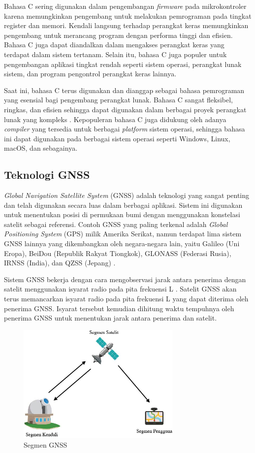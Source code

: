 Bahasa C sering digunakan dalam pengembangan \textit{firmware} pada mikrokontroler karena memungkinkan pengembang untuk melakukan pemrograman pada tingkat register dan memori. Kendali langsung terhadap perangkat keras memungkinkan pengembang untuk merancang program dengan performa tinggi dan efisien. Bahasa C juga dapat diandalkan dalam mengakses perangkat keras yang terdapat dalam sistem tertanam. Selain itu, bahasa C juga populer untuk pengembangan aplikasi tingkat rendah seperti sistem operasi, perangkat lunak sistem, dan program pengontrol perangkat keras lainnya.

Saat ini, bahasa C terus digunakan dan dianggap sebagai bahasa pemrograman yang esensial bagi pengembang perangkat lunak. Bahasa C sangat fleksibel, ringkas, dan efisien sehingga dapat digunakan dalam berbagai proyek perangkat lunak yang kompleks \cite{Deitel2016}. Kepopuleran bahasa C juga didukung oleh adanya \textit{compiler} yang tersedia untuk berbagai \textit{platform} sistem operasi, sehingga bahasa ini dapat digunakan pada berbagai sistem operasi seperti Windows, Linux, macOS, dan sebagainya.

\subsection{Teknologi GNSS}
\textit{Global Navigation Satellite System} (GNSS) adalah teknologi yang sangat penting dan telah digunakan secara luas dalam berbagai aplikasi. Sistem ini digunakan untuk menentukan posisi di permukaan bumi dengan menggunakan konstelasi satelit sebagai referensi. Contoh GNSS yang paling terkenal adalah \textit{Global Positioning System} (GPS) milik Amerika Serikat, namun terdapat lima sistem GNSS lainnya yang dikembangkan oleh negara-negara lain, yaitu Galileo (Uni Eropa), BeiDou (Republik Rakyat Tiongkok), GLONASS (Federasi Rusia), IRNSS (India), dan QZSS (Jepang) \cite{NationalCoordinationOfficeforSpace-BasedPositioning2021}.

Sistem GNSS bekerja dengan cara mengobservasi jarak antara penerima dengan satelit menggunakan isyarat radio pada pita frekuensi L \cite{TheEuropeanGlobalNavigationSatelliteSystemsAgency2021}. Satelit GNSS akan terus memancarkan isyarat radio pada pita frekuensi L yang dapat diterima oleh penerima GNSS. Isyarat tersebut kemudian dihitung waktu tempuhnya oleh penerima GNSS untuk menentukan jarak antara penerima dan satelit. 

\begin{figure}[H]
	\centering
	\includegraphics[width=8cm]{contents/chapter-2/gnss_segment.jpg}
	\caption{Segmen GNSS}
	\label{Fig: gnss_segment}
\end{figure}

